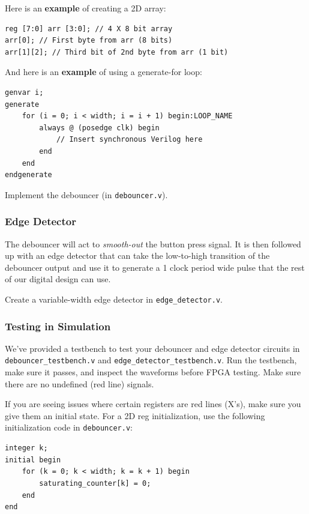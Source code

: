 \documentclass[11pt]{article}
\begin{document}
Here is an \textbf{example} of creating a 2D array:

\begin{verbatim}
reg [7:0] arr [3:0]; // 4 X 8 bit array
arr[0]; // First byte from arr (8 bits)
arr[1][2]; // Third bit of 2nd byte from arr (1 bit)
\end{verbatim}

And here is an \textbf{example} of using a generate-for loop:

\begin{verbatim}
genvar i;
generate
	for (i = 0; i < width; i = i + 1) begin:LOOP_NAME
		always @ (posedge clk) begin
			// Insert synchronous Verilog here
		end
	end
endgenerate
\end{verbatim}

Implement the debouncer (in \verb|debouncer.v|).

\subsubsection{Edge Detector}

The debouncer will act to \emph{smooth-out} the button press signal. It is then followed up with an edge detector that can take the low-to-high transition of the debouncer output and use it to generate a 1 clock period wide pulse that the rest of our digital design can use.

Create a variable-width edge detector in \verb|edge_detector.v|. 

\subsubsection{Testing in Simulation}

We've provided a testbench to test your debouncer and edge detector circuits in \verb|debouncer_testbench.v| and \verb|edge_detector_testbench.v|. Run the testbench, make sure it passes, and inspect the waveforms before FPGA testing. Make sure there are no undefined (red line) signals.

If you are seeing issues where certain registers are red lines (X's), make sure you give them an initial state. For a 2D reg initialization, use the following initialization code in \verb|debouncer.v|:

\begin{verbatim}
integer k;
initial begin
	for (k = 0; k < width; k = k + 1) begin
		saturating_counter[k] = 0;
	end
end
\end{verbatim}
\end{document}
